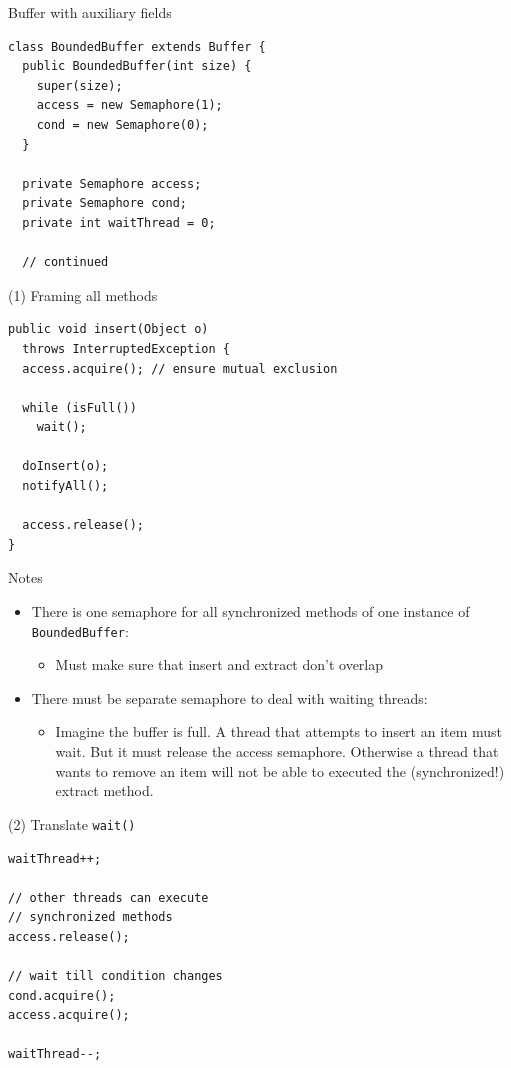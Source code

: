 \begin{frame}[fragile]{Buffer with auxiliary fields}
\begin{lstlisting}
class BoundedBuffer extends Buffer {
  public BoundedBuffer(int size) { 
    super(size);
    access = new Semaphore(1);
    cond = new Semaphore(0);
  }

  private Semaphore access;
  private Semaphore cond;
  private int waitThread = 0;
  
  // continued
\end{lstlisting}
\end{frame}

\begin{frame}[fragile]{(1) Framing all methods}
\begin{lstlisting}
public void insert(Object o)
  throws InterruptedException {
  access.acquire(); // ensure mutual exclusion

  while (isFull())
    wait();

  doInsert(o);	
  notifyAll();

  access.release();
}
\end{lstlisting}
\end{frame}

\begin{frame}{Notes}
  \begin{itemize}
  \item There is one semaphore for all synchronized methods of one
    instance of \lstinline!BoundedBuffer!:
    \begin{itemize}
    \item Must make sure that insert and extract don't overlap
    \end{itemize}
  \item There must be separate semaphore to deal with waiting
    threads:
    \begin{itemize}
    \item Imagine the buffer is full. A thread that attempts to insert
      an item must wait. But it must release the access
      semaphore. Otherwise a thread that wants to remove an item will
      not be able to executed the (synchronized!) extract method.
    \end{itemize}
  \end{itemize}
\end{frame}

\begin{frame}[fragile]{(2) Translate \lstinline!wait()!}
\begin{lstlisting}
waitThread++;

// other threads can execute 
// synchronized methods 
access.release(); 

// wait till condition changes
cond.acquire(); 
access.acquire();

waitThread--;
\end{lstlisting}
\end{frame}

